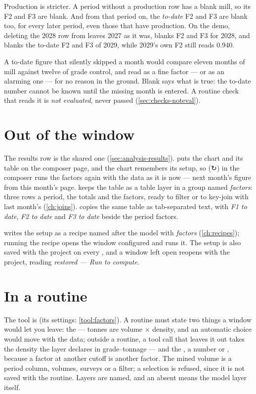 Production is stricter. A period without a production row has a blank mill, so its F2 and F3 are blank. And from that period on, the \emph{to-date} F2 and F3 are blank too, for every later period, even those that have production. On the demo, deleting the 2028 row from  leaves 2027 as it was, blanks F2 and F3 for 2028, and blanks the to-date F2 and F3 of 2029, while 2029's own F2 still reads 0.940.

\begin{why}
A to-date figure that silently skipped a month would compare eleven months of mill against twelve of grade control, and read as a fine factor — or as an alarming one — for no reason in the ground. Blank says what is true: the to-date number cannot be known until the missing month is entered. A routine check that reads it is \emph{not evaluated}, never passed (\cref{sec:checks-noteval}).
\end{why}

\section{Out of the window}\label{sec:factors-out}
The results row is the shared one (\cref{sec:analysis-results}).  puts the chart and its table on the composer page, and the chart remembers its setup, so  (↻) in the composer runs the factors again with the data as it is now — next month's figure from this month's page.  keeps the table as a table layer in a group named \emph{factors}: three rows a period, the totals and the factors, ready to filter or to key-join with last month's (\cref{ch:joins}).  copies the same table as tab-separated text, with \emph{F1 to date}, \emph{F2 to date} and \emph{F3 to date} beside the period factors.

 writes the setup as a recipe named after the model with \emph{factors} (\cref{ch:recipes}); running the recipe opens the window configured and runs it. The setup is also saved with the project on every , and a window left open reopens with the project, reading \emph{restored — Run to compute}.

\section{In a routine}\label{sec:factors-routine}
The tool is  (its settings: \cref{tool:factors}). A routine must state two things a window would let you leave: the  — tonnes are volume × density, and an automatic choice would move with the data; outside a routine, a tool call that leaves it out takes the density the layer declares in grade–tonnage — and the , a number or , because a factor at another cutoff is another factor. The mined volume is a period column, volumes, surveys or a filter; a selection is refused, since it is not saved with the routine. Layers are named, and an absent  means the model layer itself.

